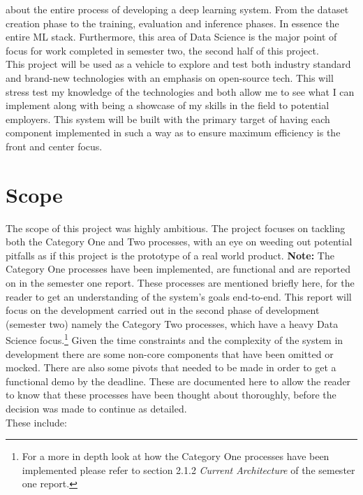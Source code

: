 about the entire process of developing a deep learning system. From the dataset creation phase to the training, evaluation and inference phases.
In essence the entire ML stack. Furthermore, this area of Data Science is the major point of focus for work completed in semester two, the second half of this project.\\
This project will be used as a vehicle to explore and test both industry standard and brand-new technologies with an emphasis on open-source tech.
This will stress test my knowledge of the
technologies and both allow me to see what I can implement along with being a showcase of my skills in the field to potential employers.
This system will be built with the primary target of having each component implemented in such a way as to ensure maximum efficiency is the
front and center focus.
\section{Scope}
The scope of this project was highly ambitious. The project focuses on tackling both the Category One and Two processes, with
an eye on weeding out potential pitfalls as if this project is the prototype of a real world product.
\bigbreak
\textbf{Note:} The Category One processes have been implemented, are functional and are reported on in the semester one report.
These processes are mentioned briefly here, for the reader to get an understanding of the
system's goals end-to-end. This report will focus on the development carried out in the second phase of development (semester two)
namely the Category Two processes, which have a heavy Data Science focus.\footnote{For a more in depth look at how the Category One
	processes have been implemented please refer to section 2.1.2 \emph{Current Architecture} of the semester one report.}
\bigbreak
Given the time constraints and the complexity of the system in development
there are some non-core components that	have been omitted or mocked. There are also some
pivots that needed to be made in order to get a functional demo by the deadline. These are
documented here to allow the reader to know that these processes have been thought about thoroughly,
before the decision was made to continue as detailed. \\ These include:
